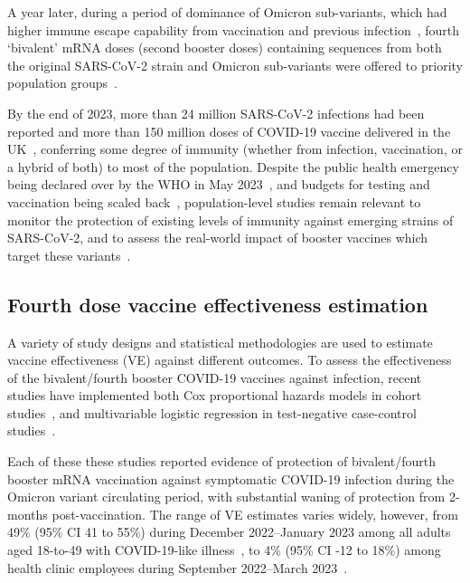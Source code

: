 A year later, during a period of dominance of Omicron sub-variants, which had higher immune escape capability from vaccination and previous infection~\parencite{Willett2022-tf, Liu2022-yo}, fourth `bivalent' mRNA doses (second booster doses) containing sequences from both the original SARS-CoV-2 strain and Omicron sub-variants were offered to priority population groups~\parencite{Medicines-and-Healthcare-products-Regulatory-Agency2022-wb, Medicines-and-Healthcare-products-Regulatory-Agency2022-zq}.

By the end of 2023, more than 24 million SARS-CoV-2 infections had been reported and more than 150 million doses of COVID-19 vaccine delivered in the UK~\parencite{Mathieu2020-oz}, conferring some degree of immunity (whether from infection, vaccination, or a hybrid of both) to most of the population. Despite the public health emergency being declared over by the WHO in May 2023~\parencite{World_Health_Organisation2023-yr}, and budgets for testing and vaccination being scaled back~\parencite{HM_Government2022-qv}, population-level studies remain relevant to monitor the protection of existing levels of immunity against emerging strains of SARS-CoV-2, and to assess the real-world impact of booster vaccines which target these variants~\parencite{Govuk2023-uj}.

\subsection{Fourth dose vaccine effectiveness estimation}

A variety of study designs and statistical methodologies are used to estimate vaccine effectiveness (VE) against different outcomes. To assess the effectiveness of the bivalent/fourth booster COVID-19 vaccines against infection, recent studies have implemented both Cox proportional hazards models in cohort studies~\parencite{Auvigne2023-ay, Huiberts2023-kq, Shrestha2023-oq}, and multivariable logistic regression in test-negative case-control studies~\parencite{Link-Gelles2023-pt, Plumb2023-ht}.

Each of these these studies reported evidence of protection of bivalent/fourth booster mRNA vaccination against symptomatic COVID-19 infection during the Omicron variant circulating period, with substantial waning of protection from 2-months post-vaccination. The range of VE estimates varies widely, however, from 49\% (95\% CI 41 to 55\%) during December 2022--January 2023 among all adults aged 18-to-49 with COVID-19-like illness~\parencite{Link-Gelles2023-pt}, to 4\% (95\% CI -12 to 18\%) among health clinic employees during September 2022--March 2023~\parencite{Shrestha2023-oq}.

